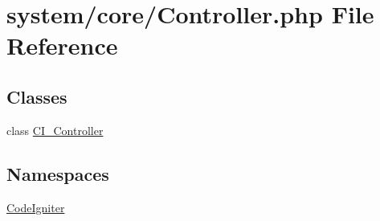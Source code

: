 \hypertarget{_controller_8php}{}\section{system/core/\+Controller.php File Reference}
\label{_controller_8php}
\subsection*{Classes}
\begin{DoxyCompactItemize}
\item 
class \mbox{\hyperlink{class_c_i___controller}{C\+I\+\_\+\+Controller}}
\end{DoxyCompactItemize}
\subsection*{Namespaces}
\begin{DoxyCompactItemize}
\item 
 \mbox{\hyperlink{namespace_code_igniter}{Code\+Igniter}}
\end{DoxyCompactItemize}
